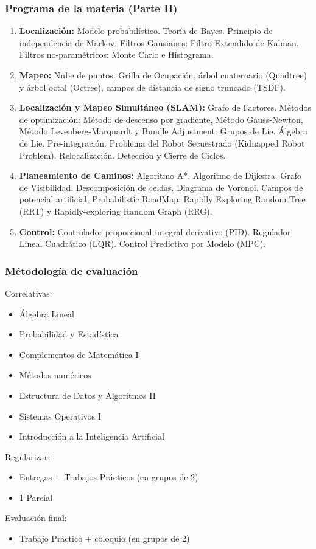 \begin{frame}
	\frametitle{Programa de la materia (Parte II)}
	\footnotesize
	\begin{enumerate}

		\item {\bf Localización:} Modelo probabilístico. Teoría de Bayes. Principio de independencia de Markov. Filtros Gausianos: Filtro Extendido de Kalman. Filtros no-paramétricos: Monte Carlo e Histograma.

		\item {\bf Mapeo:} Nube de puntos. Grilla de Ocupación, árbol cuaternario (Quadtree) y árbol octal (Octree), campos de distancia de signo truncado (TSDF).
		
		\item {\bf Localización y Mapeo Simultáneo (SLAM):} Grafo de Factores. Métodos de optimización: Método de descenso por gradiente, Método Gauss-Newton, Método Levenberg-Marquardt y Bundle Adjustment. Grupos de Lie. Álgebra de Lie. Pre-integración. Problema del Robot Secuestrado (Kidnapped Robot Problem). Relocalización. Detección y Cierre de Ciclos.
		
		\item {\bf Planeamiento de Caminos:} Algoritmo A*. Algoritmo de Dijkstra. Grafo de Visibilidad. Descomposición de celdas. Diagrama de Voronoi. Campos de potencial artificial, Probabilistic RoadMap, Rapidly Exploring Random Tree (RRT) y Rapidly-exploring Random Graph (RRG).
		
		\item {\bf Control:} Controlador proporcional-integral-derivativo (PID). Regulador Lineal Cuadrático (LQR). Control Predictivo por Modelo (MPC).
		
	\end{enumerate}

\end{frame}

\begin{frame}
	\frametitle{Métodología de evaluación}
	
	Correlativas:
	\begin{itemize}
		\item Álgebra Lineal
		\item Probabilidad y Estadística
		\item Complementos de Matemática I
		\item Métodos numéricos
		\item Estructura de Datos y Algoritmos II
		\item Sistemas Operativos I
		\item Introducción a la Inteligencia Artificial
	\end{itemize}
	
	Regularizar:
	\begin{itemize}
		\item Entregas + Trabajos Prácticos (en grupos de 2)
		\item 1 Parcial
	\end{itemize}

	Evaluación final:
	\begin{itemize}
		\item Trabajo Práctico + coloquio (en grupos de 2)
	\end{itemize}	
\end{frame}